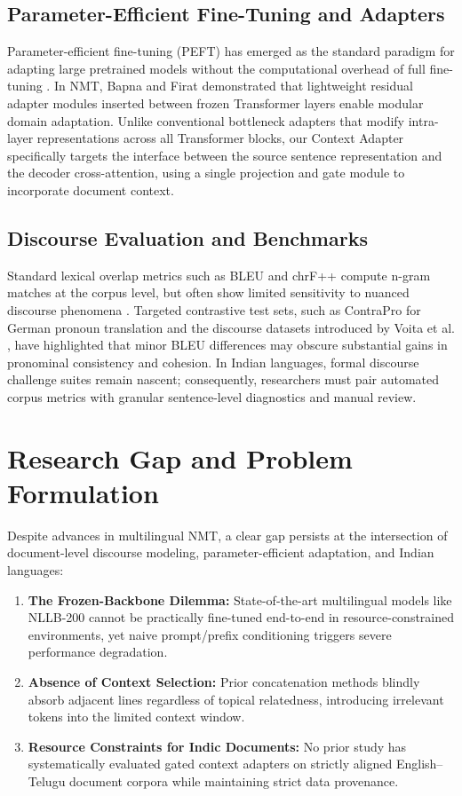 \documentclass[conference]{IEEEtran}
\begin{document}
\subsection{Parameter-Efficient Fine-Tuning and Adapters}
Parameter-efficient fine-tuning (PEFT) has emerged as the standard paradigm for adapting large pretrained models without the computational overhead of full fine-tuning \cite{houlsby2019parameter}. In NMT, Bapna and Firat \cite{bapna-firat-2019-simple} demonstrated that lightweight residual adapter modules inserted between frozen Transformer layers enable modular domain adaptation. Unlike conventional bottleneck adapters that modify intra-layer representations across all Transformer blocks, our Context Adapter specifically targets the interface between the source sentence representation and the decoder cross-attention, using a single projection and gate module to incorporate document context.

\subsection{Discourse Evaluation and Benchmarks}
Standard lexical overlap metrics such as BLEU \cite{post-2018-call} and chrF++ \cite{popovic-2017-chrf} compute n-gram matches at the corpus level, but often show limited sensitivity to nuanced discourse phenomena \cite{bawden-etal-2018-evaluating}. Targeted contrastive test sets, such as ContraPro for German pronoun translation \cite{muller2018large} and the discourse datasets introduced by Voita et al. \cite{voita-etal-2019-good}, have highlighted that minor BLEU differences may obscure substantial gains in pronominal consistency and cohesion. In Indian languages, formal discourse challenge suites remain nascent; consequently, researchers must pair automated corpus metrics with granular sentence-level diagnostics and manual review.

\section{Research Gap and Problem Formulation}
\label{sec:gap}

Despite advances in multilingual NMT, a clear gap persists at the intersection of document-level discourse modeling, parameter-efficient adaptation, and Indian languages:
\begin{enumerate}
    \item \textbf{The Frozen-Backbone Dilemma:} State-of-the-art multilingual models like NLLB-200 cannot be practically fine-tuned end-to-end in resource-constrained environments, yet naive prompt/prefix conditioning triggers severe performance degradation.
    \item \textbf{Absence of Context Selection:} Prior concatenation methods blindly absorb adjacent lines regardless of topical relatedness, introducing irrelevant tokens into the limited context window.
    \item \textbf{Resource Constraints for Indic Documents:} No prior study has systematically evaluated gated context adapters on strictly aligned English--Telugu document corpora while maintaining strict data provenance.
\end{enumerate}
\end{document}

